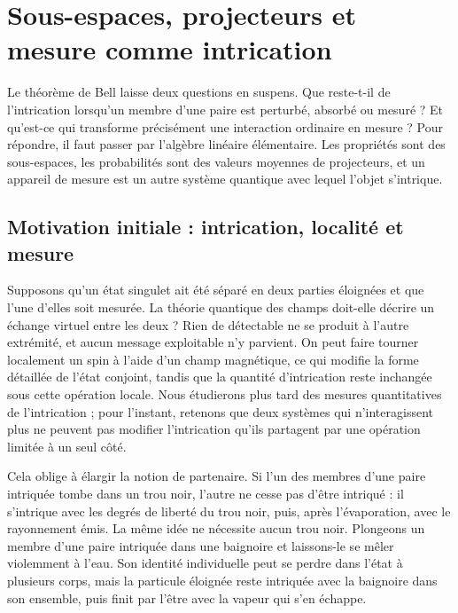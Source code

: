 \chapter{Sous-espaces, projecteurs et mesure comme intrication}

Le théorème de Bell laisse deux questions en suspens. Que reste-t-il de l’intrication lorsqu’un membre d’une paire est perturbé, absorbé ou mesuré ? Et qu’est-ce qui transforme précisément une interaction ordinaire en mesure ? Pour répondre, il faut passer par l’algèbre linéaire élémentaire. Les propriétés sont des sous-espaces, les probabilités sont des valeurs moyennes de projecteurs, et un appareil de mesure est un autre système quantique avec lequel l’objet s’intrique.

\section{Motivation initiale : intrication, localité et mesure}

Supposons qu’un état singulet ait été séparé en deux parties éloignées et que l’une d’elles soit mesurée. La théorie quantique des champs doit-elle décrire un échange virtuel entre les deux ? Rien de détectable ne se produit à l’autre extrémité, et aucun message exploitable n’y parvient. On peut faire tourner localement un spin à l’aide d’un champ magnétique, ce qui modifie la forme détaillée de l’état conjoint, tandis que la quantité d’intrication reste inchangée sous cette opération locale. Nous étudierons plus tard des mesures quantitatives de l’intrication ; pour l’instant, retenons que deux systèmes qui n’interagissent plus ne peuvent pas modifier l’intrication qu’ils partagent par une opération limitée à un seul côté.

\begin{classroomqa}
\end{classroomqa}

Cela oblige à élargir la notion de partenaire. Si l’un des membres d’une paire intriquée tombe dans un trou noir, l’autre ne cesse pas d’être intriqué : il s’intrique avec les degrés de liberté du trou noir, puis, après l’évaporation, avec le rayonnement émis. La même idée ne nécessite aucun trou noir. Plongeons un membre d’une paire intriquée dans une baignoire et laissons-le se mêler violemment à l’eau. Son identité individuelle peut se perdre dans l’état à plusieurs corps, mais la particule éloignée reste intriquée avec la baignoire dans son ensemble, puis finit par l’être avec la vapeur qui s’en échappe.

